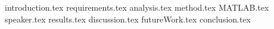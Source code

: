 

{introduction.tex}
{requirements.tex}
{analysis.tex}
{method.tex}
{MATLAB.tex}
{speaker.tex}
{results.tex}
{discussion.tex}
{futureWork.tex}
{conclusion.tex}

%

